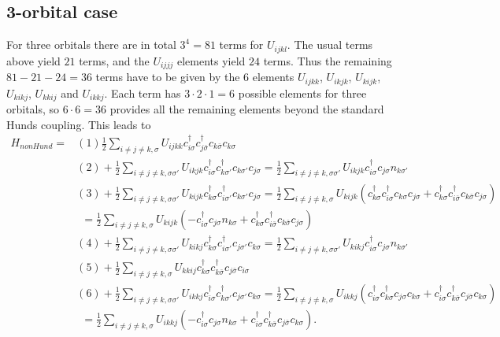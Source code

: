 \documentclass[12pt,a4paper]{scrartcl}
\numberwithin{equation}{section}
\begin{document}
\subsection{3-orbital case}
For three orbitals there are in total $3^4=81$ terms for $U_{ijkl}$. The usual terms above yield $21$ terms, 
and the $U_{ijjj}$ elements yield $24$ terms.
Thus the remaining $81-21-24=36$ terms have to be given by the $6$ elements $U_{ijkk}$, $U_{ikjk}$, $U_{kijk}$,
$U_{kikj}$, $U_{kkij}$ and $U_{ikkj}$. Each term has $3\cdot 2 \cdot 1=6$ possible elements for three orbitals,
so $6\cdot 6=36$ provides all the remaining elements beyond the standard Hunds coupling.
This leads to
\begin{align}
  H_{nonHund} 
 = & (1) \frac{1}{2}\sum_{i\neq j\neq k,\sigma} U_{ijkk} c^{\dagger}_{i\sigma} c^{\dagger}_{j\bar{\sigma}} c_{k\bar{\sigma}} c_{k\sigma} \\
% 
 & (2) + \frac{1}{2}\sum_{i\neq j\neq k,\sigma\sigma'} U_{ikjk} c^{\dagger}_{i\sigma} c^{\dagger}_{k\sigma'} c_{k\sigma'} c_{j\sigma} 
       = \frac{1}{2}\sum_{i\neq j\neq k,\sigma\sigma'} U_{ikjk} c^{\dagger}_{i\sigma} c_{j\sigma}  n_{k\sigma'}\\
% 
 & (3) + \frac{1}{2}\sum_{i\neq j\neq k,\sigma\sigma'} U_{kijk} c^{\dagger}_{k\sigma} c^{\dagger}_{i\sigma'} c_{k\sigma'} c_{j\sigma} 
       = \frac{1}{2}\sum_{i\neq j\neq k,\sigma} U_{kijk} (
                       c^{\dagger}_{k\sigma} c^{\dagger}_{i\sigma} c_{k\sigma} c_{j\sigma}
                      +c^{\dagger}_{k\sigma} c^{\dagger}_{i\bar{\sigma}} c_{k\bar{\sigma}} c_{j\sigma}
                      ) \nonumber \\
    &\ \  = \frac{1}{2}\sum_{i\neq j\neq k,\sigma} U_{kijk} ( - c^{\dagger}_{i\sigma} c_{j\sigma} n_{k\sigma}
                            +c^{\dagger}_{k\sigma} c^{\dagger}_{i\bar{\sigma}} c_{k\bar{\sigma}} c_{j\sigma} ) \\
% 
 & (4) + \frac{1}{2}\sum_{i\neq j\neq k,\sigma\sigma'} U_{kikj} c^{\dagger}_{k\sigma} c^{\dagger}_{i\sigma'} c_{j\sigma'} c_{k\sigma} 
       = \frac{1}{2}\sum_{i\neq j\neq k,\sigma\sigma'} U_{kikj} c^{\dagger}_{i\sigma} c_{j\sigma}  n_{k\sigma'}\\
%
 & (5) + \frac{1}{2}\sum_{i\neq j\neq k,\sigma} U_{kkij} c^{\dagger}_{k\sigma} c^{\dagger}_{k\bar{\sigma}} c_{j\bar{\sigma}} c_{i\sigma}  \\
% 
 & (6) + \frac{1}{2}\sum_{i\neq j\neq k,\sigma\sigma'} U_{ikkj} c^{\dagger}_{i\sigma} c^{\dagger}_{k\sigma'} c_{j\sigma'} c_{k\sigma} 
       = \frac{1}{2}\sum_{i\neq j\neq k,\sigma} U_{ikkj} (
                       c^{\dagger}_{i\sigma} c^{\dagger}_{k\sigma} c_{j\sigma} c_{k\sigma}
                      +c^{\dagger}_{i\sigma} c^{\dagger}_{k\bar{\sigma}} c_{j\bar{\sigma}} c_{k\sigma}
                      ) \nonumber  \\
    &\ \  = \frac{1}{2}\sum_{i\neq j\neq k,\sigma} U_{ikkj} ( - c^{\dagger}_{i\sigma} c_{j\sigma} n_{k\sigma}
                            +c^{\dagger}_{i\sigma} c^{\dagger}_{k\bar{\sigma}} c_{j\bar{\sigma}} c_{k\sigma} ) .
\end{align}
\end{document}
